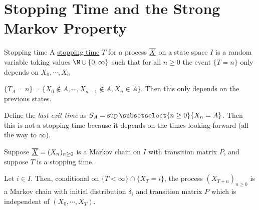 \documentclass[../Main.tex]{subfiles}
\begin{document}
\section{Stopping Time and the Strong Markov Property}
\begin{definition}{Stopping time}
    A \underline{stopping time} $T$ for a process $\underline{\overline{X}}$ on a state space $I$ is a random variable taking values $\N \cup \{0, \infty\}$ such that for all $n \geq 0$ the event $\{T = n\}$ only depends on $X_0, \cdots, X_n$
\end{definition}
\begin{example}
    $\{T_A = n\} = \{X_0 \notin A, \cdots, X_{n-1} \notin A, X_n \in A\}$.
    Then this only depends on the previous states.
\end{example}
\begin{example}
    Define the \textit{last exit time} as $S_A = \sup\subsetselect{n \geq 0}{X_n = A}$. Then this is not a stopping time because it depends on the times looking forward (all the way to $\infty$).
\end{example}
\begin{theorem}
    Suppose $\underline{\overline{X}} = (X_n)_{n \geq 0}$ is a Markov chain on $I$ with transition matrix $P$, and suppose $T$ is a stopping time.

    Let $i \in I$. Then, conditional on $\{T < \infty\} \cap \{X_T = i\}$, the process $(X_{T+n})_{n \geq 0}$ is a Markov chain with initial distribution $\delta_i$ and transition matrix $P$ which is independent of $(X_0, \cdots, X_T)$.
    \label{thmStrongMarkov}
\end{theorem}
\end{document}
